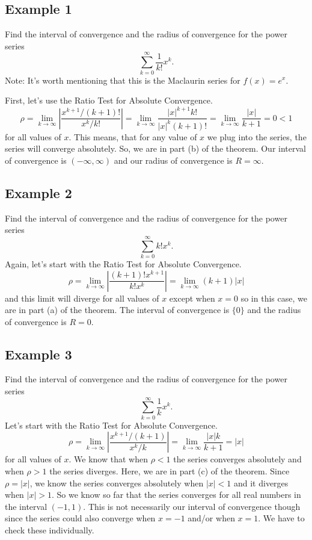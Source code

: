 \documentclass{article}
\begin{document}
\subsection*{Example 1}
Find the interval of convergence and the radius of convergence for the power series
\[
\sum_{k=0}^{\infty} \frac{1}{k!} x^k.
\]
Note: It's worth mentioning that this is the Maclaurin series for $f(x) = e^x$.

First, let's use the Ratio Test for Absolute Convergence.
\[
\rho = \lim_{k \to \infty} \left| \frac{x^{k+1} / (k+1)!}{x^k / k!} \right| = \lim_{k \to \infty} \frac{|x|^{k+1} k!}{|x|^k (k+1)!} = \lim_{k \to \infty} \frac{|x|}{k+1} = 0 < 1
\]
for all values of $x$. This means, that for any value of $x$ we plug into the series, the series will converge absolutely. So, we are in part (b) of the theorem. Our interval of convergence is $(-\infty, \infty)$ and our radius of convergence is $R = \infty$.

\subsection*{Example 2}
Find the interval of convergence and the radius of convergence for the power series
\[
\sum_{k=0}^{\infty} k! x^k.
\]
Again, let's start with the Ratio Test for Absolute Convergence.
\[
\rho = \lim_{k \to \infty} \left| \frac{(k+1)! x^{k+1}}{k! x^k} \right| = \lim_{k \to \infty} (k+1) |x|
\]
and this limit will diverge for all values of $x$ except when $x = 0$ so in this case, we are in part (a) of the theorem. The interval of convergence is $\{0\}$ and the radius of convergence is $R = 0$.

\subsection*{Example 3}
Find the interval of convergence and the radius of convergence for the power series
\[
\sum_{k=0}^{\infty} \frac{1}{k} x^k.
\]
Let's start with the Ratio Test for Absolute Convergence.
\[
\rho = \lim_{k \to \infty} \left| \frac{x^{k+1} / (k+1)}{x^k / k} \right| = \lim_{k \to \infty} \frac{|x| k}{k+1} = |x|
\]
for all values of $x$. We know that when $\rho < 1$ the series converges absolutely and when $\rho > 1$ the series diverges. Here, we are in part (c) of the theorem. Since $\rho = |x|$, we know the series converges absolutely when $|x| < 1$ and it diverges when $|x| > 1$. So we know so far that the series converges for all real numbers in the interval $(-1, 1)$. This is not necessarily our interval of convergence though since the series could also converge when $x = -1$ and/or when $x = 1$. We have to check these individually.
\end{document}
